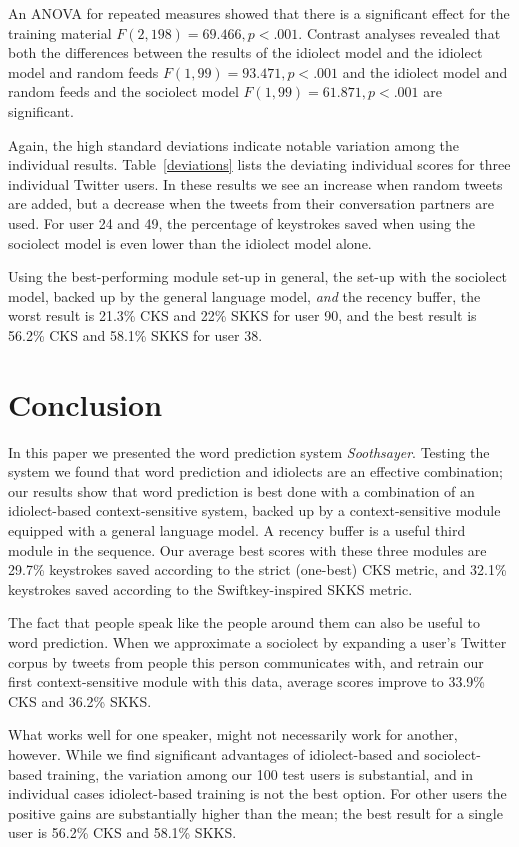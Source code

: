 \documentclass[12pt]{article}
\begin{document}
{An ANOVA for repeated measures showed that there is a significant effect for the training material $F(2,198) = 69.466, p < .001$. Contrast analyses revealed that both the differences between the results of the idiolect model and the idiolect model and random feeds $F(1,99) = 93.471, p < .001$ and the idiolect model and random feeds and the sociolect model $F(1,99) = 61.871, p < .001$ are significant.

Again, the high standard deviations indicate notable variation among the individual results. Table~\ref{deviations} lists the deviating individual scores for three individual Twitter users. In these results we see an increase when random tweets are added, but a decrease when the tweets from their conversation partners are used. For user 24 and 49, the percentage of keystrokes saved when using the sociolect model is even lower than the idiolect model alone.  

Using the best-performing module set-up in general, the set-up with the sociolect model, backed up by the general language model, \emph{and} the recency buffer, the worst result is 21.3\% CKS and 22\% SKKS for user 90, and the best result is 56.2\% CKS and 58.1\% SKKS for user 38.


\section{Conclusion} \label{conclusion}

In this paper we presented the word prediction system \emph{Soothsayer}. Testing the system we found that word prediction and idiolects are an effective combination; our results show that word prediction is best done with a combination of an idiolect-based context-sensitive system, backed up by a context-sensitive module equipped with a general language model. A recency buffer is a useful third module in the sequence. Our average best scores with these three modules are 29.7\% keystrokes saved according to the strict (one-best) CKS metric, and 32.1\% keystrokes saved according to the Swiftkey-inspired SKKS metric. 

The fact that people speak like the people around them can also be useful to word prediction. When we approximate a sociolect by expanding a user's Twitter corpus by tweets from people this person communicates with, and retrain our first context-sensitive module with this data, average scores improve to 33.9\% CKS and 36.2\% SKKS.

What works well for one speaker, might not necessarily work for another, however. While we find significant advantages of idiolect-based and sociolect-based training, the variation among our 100 test users is substantial, and in individual cases idiolect-based training is not the best option. For other users the positive gains are substantially higher than the mean; the best result for a single user is 56.2\% CKS and 58.1\% SKKS.

}
\end{document}
